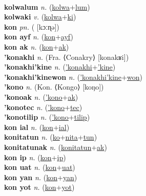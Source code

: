  \label{kolwalon} \\
\textbf{kolwalum} \textit{n.} (\hyperref[kolwa]{kolwa}+\hyperref[lum]{lum})
 \label{kolwalum} \\
\textbf{kolwaki} \textit{v.} (\hyperref[kolwa]{kolwa}+\hyperref[ki]{ki})
 \label{kolwaki} \\
\textbf{kon} \textit{pn.} ( [kɔːɳə])
 \label{kon} \\
\textbf{kon ayf} \textit{n.} (\hyperref[kon]{kon}+\hyperref[ayf]{ayf})
 \label{kon ayf} \\
\textbf{kon ak} \textit{n.} (\hyperref[kon]{kon}+\hyperref[ak]{ak})
 \label{kon ak} \\
\textbf{'konakhi} \textit{n.} (Fra. ⟨Conakry⟩ [konakʁi])
 \label{'konakhi} \\
\textbf{'konakhi'kine} \textit{n.} (\hyperref['konakhi]{'konakhi}+\hyperref['kine]{'kine})
 \label{'konakhi'kine} \\
\textbf{'konakhi'kinewon} \textit{n.} (\hyperref['konakhi'kine]{'konakhi'kine}+\hyperref[won]{won})
 \label{'konakhi'kinewon} \\
\textbf{'kono} \textit{n.} (Kon. ⟨Kongo⟩ [koŋo])
 \label{'kono} \\
\textbf{'konoak} \textit{n.} (\hyperref['kono]{'kono}+\hyperref[ak]{ak})
 \label{'konoak} \\
\textbf{'konotec} \textit{n.} (\hyperref['kono]{'kono}+\hyperref[tec]{tec})
 \label{'konotec} \\
\textbf{'konotilip} \textit{n.} (\hyperref['kono]{'kono}+\hyperref[tilip]{tilip})
 \label{'konotilip} \\
\textbf{kon ial} \textit{n.} (\hyperref[kon]{kon}+\hyperref[ial]{ial})
 \label{kon ial} \\
\textbf{konitatun} \textit{n.} (\hyperref[ko]{ko}+\hyperref[nita]{nita}+\hyperref[tun]{tun})
 \label{konitatun} \\
\textbf{konitatunak} \textit{n.} (\hyperref[konitatun]{konitatun}+\hyperref[ak]{ak})
 \label{konitatunak} \\
\textbf{kon ip} \textit{n.} (\hyperref[kon]{kon}+\hyperref[ip]{ip})
 \label{kon ip} \\
\textbf{kon uat} \textit{n.} (\hyperref[kon]{kon}+\hyperref[uat]{uat})
 \label{kon uat} \\
\textbf{kon yan} \textit{n.} (\hyperref[kon]{kon}+\hyperref[yan]{yan})
 \label{kon yan} \\
\textbf{kon yot} \textit{n.} (\hyperref[kon]{kon}+\hyperref[yot]{yot})
 \label{kon yot} \\
